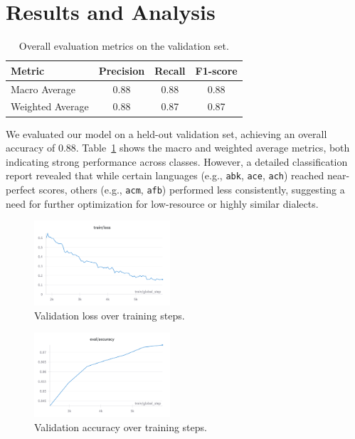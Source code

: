 \documentclass[11pt]{article}
\begin{document}
\section{Results and Analysis}
\begin{table}[H]
\centering
\setlength{\tabcolsep}{2pt}
\begin{tabular}{lccc}
\toprule
\textbf{Metric} & \textbf{Precision} & \textbf{Recall} & \textbf{F1-score} \\
\midrule
Macro Average & 0.88 & 0.88 & 0.88 \\
Weighted Average & 0.88 & 0.87 & 0.87 \\
\bottomrule
\end{tabular}
\caption{Overall evaluation metrics on the validation set.}
\label{tab:metrics}
\end{table}

We evaluated our model on a held-out validation set, achieving an overall accuracy of 0.88. Table~\ref{tab:metrics} shows the macro and weighted average metrics, both indicating strong performance across classes. However, a detailed classification report revealed that while certain languages (e.g., \texttt{abk}, \texttt{ace}, \texttt{ach}) reached near-perfect scores, others (e.g., \texttt{acm}, \texttt{afb}) performed less consistently, suggesting a need for further optimization for low-resource or highly similar dialects.

\begin{figure}[H]
    \centering
    \includegraphics[width=0.45\textwidth]{figures/new_ANLP_kaggle_validation_loss_over_epochs.png.png}
    \caption{Validation loss over training steps.}
    \label{fig:val_loss}
\end{figure}

\begin{figure}[H]
    \centering
    \includegraphics[width=0.45\textwidth]{figures/new_ANLP_kaggle_validation_accuracy_over_epochs.png}
    \caption{Validation accuracy over training steps.}
    \label{fig:val_accuracy}
\end{figure}
\end{document}
